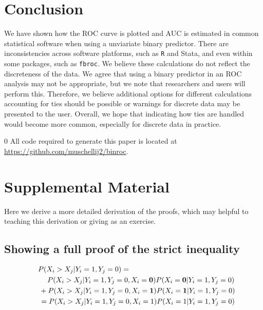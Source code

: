 \documentclass[12pt]{article}
\newcommand{\blind}{0}
\begin{document}
\hypertarget{conclusion}{%
\section{Conclusion}\label{conclusion}}

We have shown how the ROC curve is plotted and AUC is estimated in
common statistical software when using a unviariate binary predictor.
There are inconsistencies across software platforms, such as \texttt{R}
and Stata, and even within some packages, such as \texttt{fbroc}. We
believe these calculations do not reflect the discreteness of the data.
We agree that using a binary predictor in an ROC analysis may not be
appropriate, but we note that researchers and users will perform this.
Therefore, we believe additional options for different calculations
accounting for ties should be possible or warnings for discrete data may
be presented to the user. Overall, we hope that indicating how ties are
handled would become more common, especially for discrete data in
practice.

\blind 
{
All code required to generate this paper is located at
\url{https://github.com/muschellij2/binroc}.
} \fi

\hypertarget{supplemental-material}{%
\section{Supplemental Material}\label{supplemental-material}}

Here we derive a more detailed derivation of the proofs, which may
helpful to teaching this derivation or giving as an exercise.

\hypertarget{showing-a-full-proof-of-the-strict-inequality}{%
\subsection{Showing a full proof of the strict
inequality}\label{showing-a-full-proof-of-the-strict-inequality}}

\begin{align}
& P(X_{i} > X_{j} | Y_{i} = 1, Y_{j} = 0) = \;\;\;\; \nonumber \\ 
\;\;\; & \hspace{1.3em}P(X_{i} > X_{j} | Y_{i} = 1, Y_{j} = 0, X_{i} = {\bf 0}) P(X_{i} = {\bf 0} | Y_{i} = 1, Y_{j} = 0) \nonumber \\
\;\;\; &\,+ P(X_{i} > X_{j} | Y_{i} = 1, Y_{j} = 0, X_{i} = {\bf 1}) P(X_{i} = {\bf 1} | Y_{i} = 1, Y_{j} = 0) \nonumber \\
\;\;\; &\,= P(X_{i} > X_{j} | Y_{i} = 1, Y_{j} = 0, X_{i} = 1) P(X_{i} = 1 | Y_{i} = 1, Y_{j} = 0) \label{eq:expand_supp}
\end{align}
\end{document}
